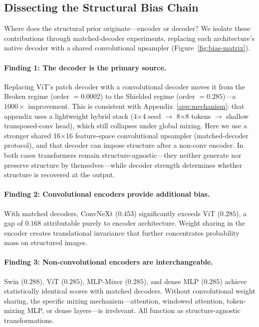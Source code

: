 \documentclass{article}
\begin{document}
\subsection{Dissecting the Structural Bias Chain}
\label{sec:bias-chain}


Where does the structural prior originate---encoder or decoder? We isolate these contributions through matched-decoder experiments, replacing each architecture's native decoder with a shared convolutional upsampler (Figure~\ref{fig:bias-matrix}).

\paragraph{Finding 1: The decoder is the primary source.}
Replacing ViT's patch decoder with a convolutional decoder moves it from the Broken regime (order $= 0.0002$) to the Shielded regime (order $= 0.285$)---a $1000\times$ improvement. This is consistent with Appendix~\ref{app:mechanism}: that appendix uses a lightweight hybrid stack (4$\times$4 seed $\rightarrow$ 8$\times$8 tokens $\rightarrow$ shallow transposed-conv head), which still collapses under global mixing. Here we use a stronger shared 16$\times$16 feature-space convolutional upsampler (matched-decoder protocol), and that decoder can impose structure after a non-conv encoder. In both cases transformers remain structure-agnostic---they neither generate nor preserve structure by themselves---while decoder strength determines whether structure is recovered at the output.

\paragraph{Finding 2: Convolutional encoders provide additional bias.}
With matched decoders, ConvNeXt ($0.453$) significantly exceeds ViT ($0.285$), a gap of $0.168$ attributable purely to encoder architecture. Weight sharing in the encoder creates translational invariance that further concentrates probability mass on structured images.

\paragraph{Finding 3: Non-convolutional encoders are interchangeable.}
Swin ($0.288$), ViT ($0.285$), MLP-Mixer ($0.285$), and dense MLP ($0.285$) achieve statistically identical scores with matched decoders. Without convolutional weight sharing, the specific mixing mechanism---attention, windowed attention, token-mixing MLP, or dense layers---is irrelevant. All function as structure-agnostic transformations.
\end{document}
